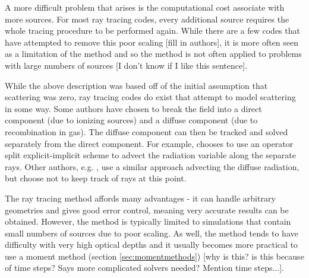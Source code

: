 A more difficult problem that arises is the computational cost associate with more sources. For most ray tracing codes, every additional source requires the whole tracing procedure to be performed again. While there are a few codes that have attempted to remove this poor scaling [fill in authors], it is more often seen as a limitation of the method and so the method is not often applied to problems with large numbers of sources [I don't know if I like this sentence].

While the above description was based off of the initial assumption that scattering was zero, ray tracing codes do exist that attempt to model scattering in some way. Some authors have chosen to break the field into a direct component (due to ionizing sources) and a diffuse component (due to recombination in gas). The diffuse component can then be tracked and solved separately from the direct component. For example, \citet{razoumovScott99} chooses to use an operator split explicit-implicit scheme to advect the radiation variable along the separate rays. Other authors, e.g. \citet{abelNormanMadau99}, use a similar approach advecting the diffuse radiation, but choose not to keep track of rays at this point.

The ray tracing method affords many advantages - it can handle arbitrary geometries and gives good error control, meaning very accurate results can be obtained. However, the method is typically limited to simulations that contain small numbers of sources due to poor scaling. As well, the method tends to have difficulty with very high optical depths and it usually becomes more practical to use a moment method (section \ref{sec:momentmethods}) [why is this? is this because of time steps? Says more complicated solvers needed? Mention time steps...].


%

